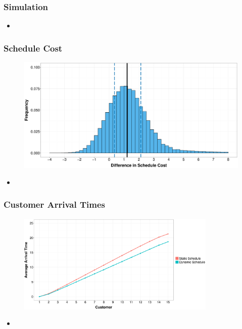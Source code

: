 \documentclass{beamer}
\begin{document}
\begin{frame}
	\frametitle{Simulation}

	\begin{itemize}
		\item 
	\end{itemize}
\end{frame}

\begin{frame}
	\frametitle{Schedule Cost}

	\begin{figure}
		\centering
		\includegraphics[width=\textwidth]{Cost_Hist_Diff.eps}
	\end{figure}

	\begin{itemize}
		\item 
	\end{itemize}
\end{frame}

\begin{frame}
	\frametitle{Customer Arrival Times}

	\begin{figure}
		\centering
		\includegraphics[width=0.85\textwidth]{AT_Line.eps}
	\end{figure}

	\begin{itemize}
		\item 
	\end{itemize}
\end{frame}
\end{document}
